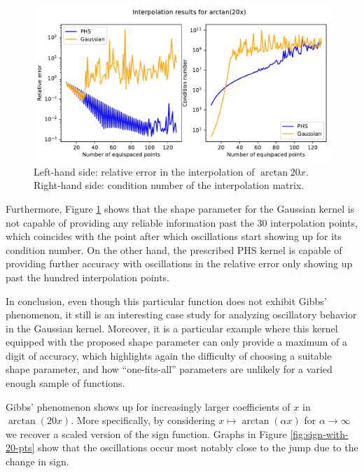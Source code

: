 \documentclass[12pt]{report} %
\begin{document}
\begin{figure}[ht]
  \centering
  \includegraphics[width=.8\textwidth]{imagenes/experiments/1d/intro/arctan20x-interpolation-curves.pdf}
  \caption{Left-hand side: relative error in the interpolation of $\arctan{20x}$. Right-hand side: condition number of the interpolation matrix.}
  \label{fig:arctan-with-curves}
\end{figure}

Furthermore, Figure \ref{fig:arctan-with-curves} shows that the shape parameter for the Gaussian kernel is not capable of providing any reliable information past the 30 interpolation points, which coincides with the point after which oscillations start showing up for its condition number. On the other hand, the prescribed PHS kernel is capable of providing further accuracy with oscillations in the relative error only showing up past the hundred interpolation points.

In conclusion, even though this particular function does not exhibit Gibbs' phenomenon, it still is an interesting case study for analyzing oscillatory behavior in the Gaussian kernel. Moreover, it is a particular example where this kernel equipped with the proposed shape parameter can only provide a maximum of a digit of accuracy, which highlights again the difficulty of choosing a suitable shape parameter, and how ``one-fits-all'' parameters are unlikely for a varied enough sample of functions.

Gibbs' phenomenon shows up for increasingly larger coefficients of $x$ in $\arctan(20x)$. More specifically, by considering $x\mapsto \arctan(\alpha x)$ for $\alpha \to \infty$ we recover a scaled version of the sign function. Graphs in Figure \ref{fig:sign-with-20-pts} show that the oscillations occur most notably close to the jump due to the change in sign.
\end{document}
